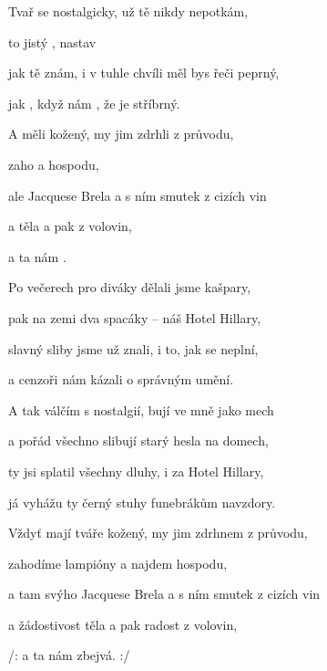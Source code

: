 

\zs
Tvař se  nostalgicky, už tě nikdy nepotkám, 

 to jistý , nastav 

jak tě znám, i v tuhle chvíli měl bys řeči peprný,  

jak , když nám , že je  stříbrný.  
\ks

\zr
A  měli kožený, my jim zdrhli z průvodu,

zaho a  hospodu,

ale  Jacquese Brela a s ním smutek z cizích vin

a  těla a pak  z volovin,

a ta nám .
\kr

\zs
Po večerech pro diváky dělali jsme kašpary,

pak na zemi dva spacáky -- náš Hotel Hillary,

slavný sliby jsme už znali, i to, jak se neplní,

a cenzoři nám kázali o správným umění.
\ks

\zr  \kr

\zs
A tak válčím s nostalgií, bují ve mně jako mech

a pořád všechno slibují starý hesla na domech,

ty jsi splatil všechny dluhy, i za Hotel Hillary,

já vyhážu ty černý stuhy funebrákům navzdory.
\ks

\zr
Vždyť mají tváře kožený, my jim zdrhnem z průvodu,

zahodíme lampióny a najdem hospodu,

a tam svýho Jacquese Brela a s ním smutek z cizích vin

a žádostivost těla a pak radost z volovin,

/: a ta nám zbejvá. :/
\kr

\kp





